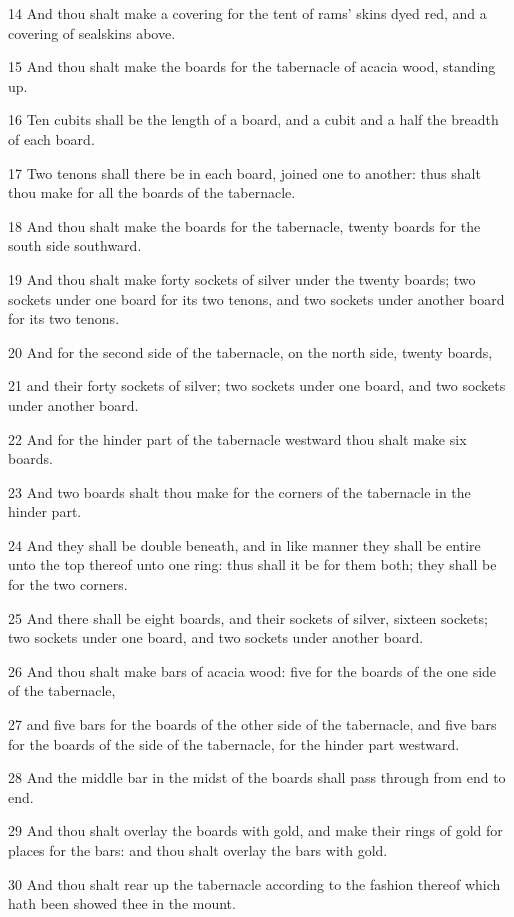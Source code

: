 \par 14 And thou shalt make a covering for the tent of rams' skins dyed red, and a covering of sealskins above.
\par 15 And thou shalt make the boards for the tabernacle of acacia wood, standing up.
\par 16 Ten cubits shall be the length of a board, and a cubit and a half the breadth of each board.
\par 17 Two tenons shall there be in each board, joined one to another: thus shalt thou make for all the boards of the tabernacle.
\par 18 And thou shalt make the boards for the tabernacle, twenty boards for the south side southward.
\par 19 And thou shalt make forty sockets of silver under the twenty boards; two sockets under one board for its two tenons, and two sockets under another board for its two tenons.
\par 20 And for the second side of the tabernacle, on the north side, twenty boards,
\par 21 and their forty sockets of silver; two sockets under one board, and two sockets under another board.
\par 22 And for the hinder part of the tabernacle westward thou shalt make six boards.
\par 23 And two boards shalt thou make for the corners of the tabernacle in the hinder part.
\par 24 And they shall be double beneath, and in like manner they shall be entire unto the top thereof unto one ring: thus shall it be for them both; they shall be for the two corners.
\par 25 And there shall be eight boards, and their sockets of silver, sixteen sockets; two sockets under one board, and two sockets under another board.
\par 26 And thou shalt make bars of acacia wood: five for the boards of the one side of the tabernacle,
\par 27 and five bars for the boards of the other side of the tabernacle, and five bars for the boards of the side of the tabernacle, for the hinder part westward.
\par 28 And the middle bar in the midst of the boards shall pass through from end to end.
\par 29 And thou shalt overlay the boards with gold, and make their rings of gold for places for the bars: and thou shalt overlay the bars with gold.
\par 30 And thou shalt rear up the tabernacle according to the fashion thereof which hath been showed thee in the mount.
